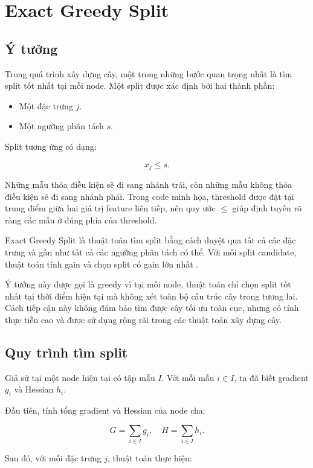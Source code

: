 \section{Exact Greedy Split}

\subsection{Ý tưởng}

Trong quá trình xây dựng cây, một trong những bước quan trọng nhất là tìm split tốt nhất tại mỗi node. Một split được xác định bởi hai thành phần:

\begin{itemize}
    \item Một đặc trưng $j$.
    \item Một ngưỡng phân tách $s$.
\end{itemize}

Split tương ứng có dạng:

\[
x_j \leq s.
\]

Những mẫu thỏa điều kiện sẽ đi sang nhánh trái, còn những mẫu không thỏa điều kiện sẽ đi sang nhánh phải. Trong code minh họa, threshold được đặt tại trung điểm giữa hai giá trị feature liên tiếp, nên quy ước $\leq$ giúp định tuyến rõ ràng các mẫu ở đúng phía của threshold.

Exact Greedy Split là thuật toán tìm split bằng cách duyệt qua tất cả các đặc trưng và gần như tất cả các ngưỡng phân tách có thể. Với mỗi split candidate, thuật toán tính gain và chọn split có gain lớn nhất \cite{chen2016xgboost}.

Ý tưởng này được gọi là greedy vì tại mỗi node, thuật toán chỉ chọn split tốt nhất tại thời điểm hiện tại mà không xét toàn bộ cấu trúc cây trong tương lai. Cách tiếp cận này không đảm bảo tìm được cây tối ưu toàn cục, nhưng có tính thực tiễn cao và được sử dụng rộng rãi trong các thuật toán xây dựng cây.

\subsection{Quy trình tìm split}

Giả sử tại một node hiện tại có tập mẫu $I$. Với mỗi mẫu $i \in I$, ta đã biết gradient $g_i$ và Hessian $h_i$.

Đầu tiên, tính tổng gradient và Hessian của node cha:

\[
G = \sum_{i \in I} g_i,
\quad
H = \sum_{i \in I} h_i.
\]

Sau đó, với mỗi đặc trưng $j$, thuật toán thực hiện:

